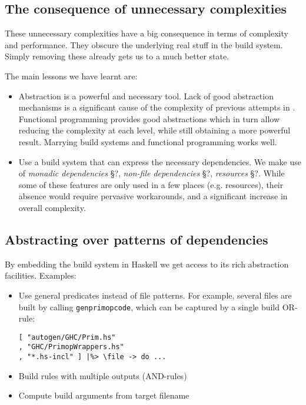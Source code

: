 \subsection{The consequence of unnecessary complexities}

These unnecessary complexities have a big consequence in terms of complexity and performance. They obscure the underlying real stuff in the build system. Simply removing these already gets us to a much better state.

The main lessons we have learnt are:

\begin{itemize}
\item Abstraction is a powerful and necessary tool. Lack of good abstraction mechanisms is a significant cause of the complexity of previous attempts in \make{}. Functional programming provides good abstractions which in turn allow reducing the complexity at each level, while still obtaining a more powerful result. Marrying build systems and functional programming works well.
\item Use a build system that can express the necessary dependencies. We make use of \textit{monadic dependencies} \S?, \textit{non-file dependencies} \S?, \textit{resources} \S?. While some of these features are only used in a few places (e.g. resources), their absence would require pervasive workarounds, and a significant increase in overall complexity.
\end{itemize}

\subsection{Abstracting over patterns of dependencies}


By embedding the build system in Haskell we get access to its rich abstraction
facilities. Examples:
\begin{itemize}
  \item Use general predicates instead of file patterns. For example, several
  files are built by calling \texttt{genprimopcode}, which can be captured by a
  single build OR-rule:

\begin{lstlisting}
[ "autogen/GHC/Prim.hs"
, "GHC/PrimopWrappers.hs"
, "*.hs-incl" ] |%> \file -> do ...
\end{lstlisting}

  \item Build rules with multiple outputs (AND-rules)
  \item Compute build arguments from target filename
\end{itemize}
